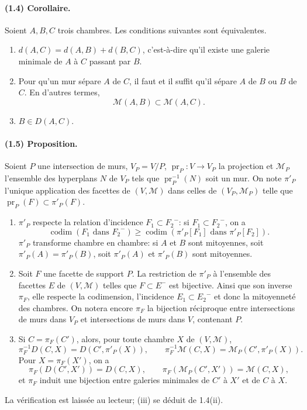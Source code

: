 \documentclass[10pt,a4paper]{article}
\newcommand{\codim}{\operatorname{codim}}
\newcommand{\cl}[1]{{#1}^{-}}
\newcommand{\mcA}{\mathcal M}
\newcommand{\mcM}{\mathcal M}
\begin{document}
\paragraph{(1.4) Corollaire.} Soient $A,B,C$ trois chambres. Les conditions suivantes sont équivalentes.
\begin{enumerate}[label=(\roman*)]
\item $d(A,C)=d(A,B)+d(B,C)$, c'est-à-dire qu'il existe une galerie minimale de $A$ à $C$ passant par $B$.
\item Pour qu'un mur sépare $A$ de $C$, il faut et il suffit qu'il sépare $A$ de $B$ ou $B$ de $C$. En d'autres termes,
\[
\mcM(A,B)\subset\mcM(A,C).
\]
\item $B\in D(A,C)$.
\end{enumerate}

\paragraph{(1.5) Proposition.} Soient $P$ une intersection de murs, $V_P=V/P$, $\operatorname{pr}_P:V\to V_P$ la projection et $\mcA_P$ l'ensemble des hyperplans $N$ de $V_P$ tels que $\operatorname{pr}_P^{-1}(N)$ soit un mur. On note $\pi'_P$ l'unique application des facettes de $(V,\mcA)$ dans celles de $(V_P,\mcA_P)$ telle que $\operatorname{pr}_P(F)\subset \pi'_P(F)$.
\begin{enumerate}[label=(\roman*)]
\item $\pi'_P$ respecte la relation d'incidence $F_1\subset\cl{F_2}$: si $F_1\subset\cl{F_2}$, on a
\[
\codim(F_1\text{ dans }\cl{F_2})\ge
\codim(\pi'_P[F_1]\text{ dans }\pi'_P[F_2]).
\]
$\pi'_P$ transforme chambre en chambre: si $A$ et $B$ sont mitoyennes, soit $\pi'_P(A)=\pi'_P(B)$, soit $\pi'_P(A)$ et $\pi'_P(B)$ sont mitoyennes.
\item Soit $F$ une facette de support $P$. La restriction de $\pi'_P$ à l'ensemble des facettes $E$ de $(V,\mcA)$ telles que $F\subset\cl E$ est bijective. Ainsi que son inverse $\pi_F$, elle respecte la codimension, l'incidence $E_1\subset\cl{E_2}$ et donc la mitoyenneté des chambres. On notera encore $\pi_F$ la bijection réciproque entre intersections de murs dans $V_P$ et intersections de murs dans $V$, contenant $P$.
\item Si $C=\pi_F(C')$, alors, pour toute chambre $X$ de $(V,\mcA)$,
\[
\pi_F^{-1}D(C,X)=D(C',\pi'_P(X)),\qquad
\pi_F^{-1}\mcM(C,X)=\mcM_P(C',\pi'_P(X)).
\]
Pour $X=\pi_F(X')$, on a
\[
\pi_F(D(C',X'))=D(C,X),\qquad
\pi_F(\mcM_P(C',X'))=\mcM(C,X),
\]
et $\pi_F$ induit une bijection entre galeries minimales de $C'$ à $X'$ et de $C$ à $X$.
\end{enumerate}
La vérification est laissée au lecteur; (iii) se déduit de 1.4(ii).
\end{document}
